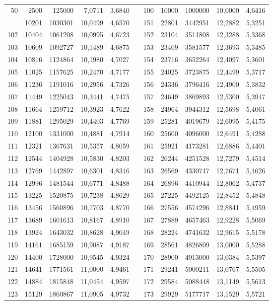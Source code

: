\begin{longtable}{rrrrrrrrrrr}
50&2500&125000&7,0711&3,6840&&100&10000&1000000&10,0000&4,6416\\
\newpage
101&10201&1030301&10,0499&4,6570&&151&22801&3442951&12,2882&5,3251\\
102&10404&1061208&10,0995&4,6723&&152&23104&3511808&12,3288&5,3368\\
103&10609&1092727&10,1489&4,6875&&153&23409&3581577&12,3693&5,3485\\
104&10816&1124864&10,1980&4,7027&&154&23716&3652264&12,4097&5,3601\\
105&11025&1157625&10,2470&4,7177&&155&24025&3723875&12,4499&5,3717\\
106&11236&1191016&10,2956&4,7326&&156&24336&3796416&12,4900&5,3832\\
107&11449&1225043&10,3441&4,7475&&157&24649&3869893&12,5300&5,3947\\
108&11664&1259712&10,3923&4,7622&&158&24964&3944312&12,5698&5,4061\\
109&11881&1295029&10,4403&4,7769&&159&25281&4019679&12,6095&5,4175\\
110&12100&1331000&10,4881&4,7914&&160&25600&4096000&12,6491&5,4288\\
111&12321&1367631&10,5357&4,8059&&161&25921&4173281&12,6886&5,4401\\
112&12544&1404928&10,5830&4,8203&&162&26244&4251528&12,7279&5,4514\\
113&12769&1442897&10,6301&4,8346&&163&26569&4330747&12,7671&5,4626\\
114&12996&1481544&10,6771&4,8488&&164&26896&4410944&12,8062&5,4737\\
115&13225&1520875&10,7238&4,8629&&165&27225&4492125&12,8452&5,4848\\
116&13456&1560896&10,7703&4,8770&&166&27556&4574296&12,8841&5,4959\\
117&13689&1601613&10,8167&4,8910&&167&27889&4657463&12,9228&5,5069\\
118&13924&1643032&10,8628&4,9049&&168&28224&4741632&12,9615&5,5178\\
119&14161&1685159&10,9087&4,9187&&169&28561&4826809&13,0000&5,5288\\
120&14400&1728000&10,9545&4,9324&&170&28900&4913000&13,0384&5,5397\\
121&14641&1771561&11,0000&4,9461&&171&29241&5000211&13,0767&5,5505\\
122&14884&1815848&11,0454&4,9597&&172&29584&5088448&13,1149&5,5613\\
123&15129&1860867&11,0905&4,9732&&173&29929&5177717&13,1529&5,5721\\

\end{longtable}
